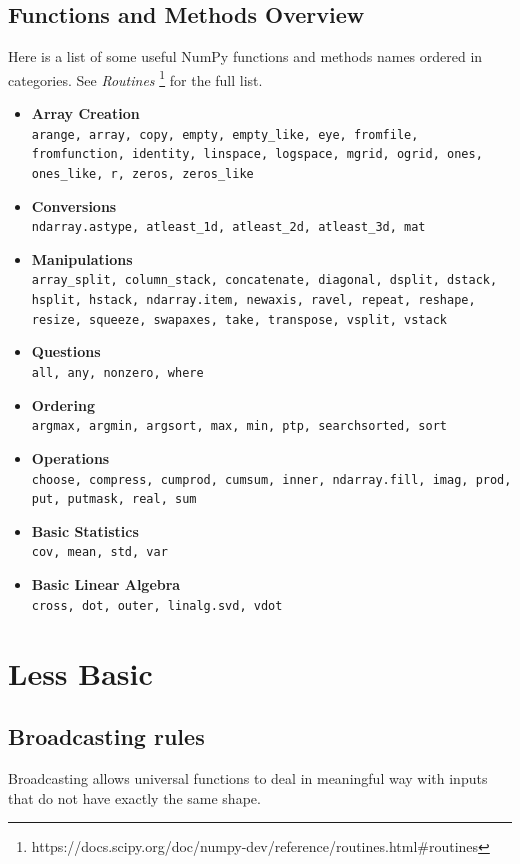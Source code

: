 \documentclass[UTF8]{article}
\begin{document}
\subsection{Functions and Methods Overview}
Here is a list of some useful NumPy functions and methods names ordered in categories. See
\emph{Routines} \footnote{https://docs.scipy.org/doc/numpy-dev/reference/routines.html\#routines}
for the full list.
\begin{itemize}
    \item \textbf{Array Creation} \\
    \texttt{arange, array, copy, empty, empty\_like, eye, fromfile, fromfunction, identity,
    linspace, logspace, mgrid, ogrid, ones, ones\_like, r, zeros, zeros\_like}
    \item \textbf{Conversions} \\
    \texttt{ndarray.astype, atleast\_1d, atleast\_2d, atleast\_3d, mat}
    \item \textbf{Manipulations} \\
    \texttt{array\_split, column\_stack, concatenate, diagonal, dsplit, dstack, hsplit, hstack,
    ndarray.item, newaxis, ravel, repeat, reshape, resize, squeeze, swapaxes, take, transpose,
    vsplit, vstack}
    \item \textbf{Questions} \\
    \texttt{all, any, nonzero, where}
    \item \textbf{Ordering} \\
    \texttt{argmax, argmin, argsort, max, min, ptp, searchsorted, sort}
    \item \textbf{Operations} \\
    \texttt{choose, compress, cumprod, cumsum, inner, ndarray.fill, imag, prod, put, putmask, real,
    sum}
    \item \textbf{Basic Statistics} \\
    \texttt{cov, mean, std, var}
    \item \textbf{Basic Linear Algebra} \\
    \texttt{cross, dot, outer, linalg.svd, vdot}
\end{itemize}

\section{Less Basic}
\subsection{Broadcasting rules}
Broadcasting allows universal functions to deal in meaningful way with inputs that do not have
exactly the same shape.
\end{document}
